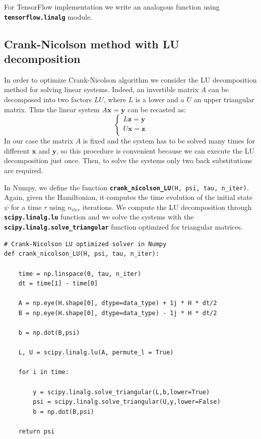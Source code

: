 \documentclass[rmp,10pt,onecolumn,fleqn,notitlepage]{revtex4-1}
\begin{document}
For TensorFlow implementation we write an analogous function using {\bfseries\texttt{tensorflow.linalg}} module.
 
\subsection{Crank-Nicolson method with LU decomposition} 
\label{subsec:crank-nicolson-lu}
In order to optimize Crank-Nicolson algorithm we consider the LU decomposition method for solving linear systems. 
Indeed, an invertible matrix $A$ can be decomposed into two factors $LU$, where $L$ is a lower and a $U$ an upper triangular matrix. Thus the linear system $A\boldsymbol{x} = \boldsymbol{y}$ can be recasted as: 
\begin{equation}
    \begin{cases}
        L\boldsymbol{z} = \boldsymbol{y} \\
        U\boldsymbol{x} = \boldsymbol{z} \\
    \end{cases}
\end{equation}
In our case the matrix $A$ is fixed and the system has to be solved many times for different $\boldsymbol{x}$ and $\boldsymbol{y}$, so this procedure is convenient because we can execute the LU decomposition just once. Then, to solve the systems only two back substitutions are required.

In Numpy, we define the function {\bfseries \texttt{crank\_nicolson\_LU}}\texttt{(H, psi, tau, n\_iter)}. Again, given the Hamiltonian, it computes the time evolution of the initial state $\psi$ for a time $\tau$ using $n_{iter}$ iterations.
We compute the LU decomposition through {\bfseries\texttt{scipy.linalg.lu}} function and we solve the systems with the {\bfseries\texttt{scipy.linalg.solve\_triangular}} function optimized for triangular matrices. 

\begin{lstlisting}[style=myPython]
# Crank-Nicolson LU optimized solver in Numpy
def crank_nicolson_LU(H, psi, tau, n_iter):
    
    time = np.linspace(0, tau, n_iter)
    dt = time[1] - time[0]
    
    A = np.eye(H.shape[0], dtype=data_type) + 1j * H * dt/2
    B = np.eye(H.shape[0], dtype=data_type) - 1j * H * dt/2

    b = np.dot(B,psi) 
    
    L, U = scipy.linalg.lu(A, permute_l = True)

    for i in time:
        
        y = scipy.linalg.solve_triangular(L,b,lower=True)
        psi = scipy.linalg.solve_triangular(U,y,lower=False)        
        b = np.dot(B,psi) 
    
    return psi
\end{lstlisting}
\end{document}
